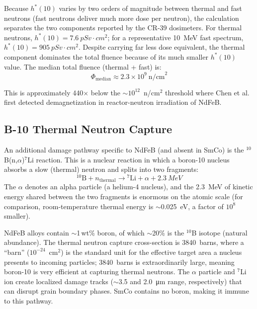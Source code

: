 \documentclass[11pt,letterpaper]{article}
\newcommand{\ndfeb}{NdFeB}
\newcommand{\smco}{SmCo}
\begin{document}
Because $h^*(10)$ varies by two orders of magnitude between thermal and fast
neutrons (fast neutrons deliver much more dose per neutron), the calculation
separates the two components reported by the CR-39 dosimeters. For thermal neutrons, $h^*(10) = \SI{7.6}{pSv \cdot cm^2}$; for
a representative \SI{10}{MeV} fast spectrum, $h^*(10) = \SI{905}{pSv \cdot
cm^2}$. Despite carrying far less dose equivalent, the thermal component
dominates the total fluence because of its much smaller $h^*(10)$ value. The
median total fluence (thermal + fast) is:
\begin{equation*}
    \Phi_\mathrm{median} \approx 2.3 \times 10^9~\mathrm{n/cm}^2
\end{equation*}

This is approximately 440$\times$ below the $\sim$$10^{12}$~n/cm$^2$
threshold where Chen et al.~\cite{Chen2014} first detected demagnetization in
reactor-neutron irradiation of \ndfeb{}.

\subsection{B-10 Thermal Neutron Capture}

An additional damage pathway specific to \ndfeb{} (and absent in \smco{}) is
the ${}^{10}$B(n,$\alpha$)${}^{7}$Li reaction. This is a nuclear reaction in
which a boron-10 nucleus absorbs a slow (thermal) neutron and splits into two
fragments:
\begin{equation*}
    {}^{10}\mathrm{B} + n_\mathrm{thermal} \to {}^{7}\mathrm{Li} + \alpha
    + \SI{2.3}{MeV}
\end{equation*}
The $\alpha$ denotes an alpha particle (a helium-4 nucleus), and the
\SI{2.3}{MeV} of kinetic energy shared between the two fragments is enormous
on the atomic scale (for comparison, room-temperature thermal energy is
$\sim$0.025~eV, a factor of $10^8$ smaller).

NdFeB alloys contain $\sim$1\,wt\% boron, of which $\sim$20\% is
the ${}^{10}$B isotope (natural abundance). The thermal neutron capture
cross-section is \SI{3840}{barns}, where a ``barn'' ($10^{-24}$~cm$^2$) is the
standard unit for the effective target area a nucleus presents to incoming
particles; 3840~barns is extraordinarily large, meaning boron-10 is very
efficient at capturing thermal neutrons. The $\alpha$ particle and ${}^{7}$Li
ion create localized damage tracks ($\sim$3.5 and \SI{2.0}{\micro m} range,
respectively) that can disrupt grain boundary phases. SmCo contains no boron,
making it immune to this pathway.
\end{document}
